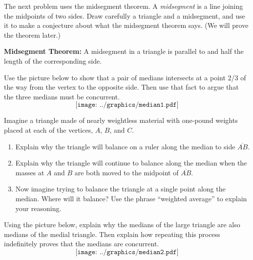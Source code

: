 \begin{prob}
The next problem uses the midsegment theorem.  A \emph{midsegment} is a line joining the midpoints of two sides.  Draw carefully a triangle and a midsegment, and use it to make a conjecture about what the midsegment theorem says.  (We will prove the theorem later.)
\end{prob}

\begin{teachingnote}
\textbf{Midsegment Theorem:}  A midsegment in a triangle is parallel to and half the length of the corresponding side.
\end{teachingnote}

\begin{prob}
Use the picture below to show that a pair of medians intersects at a point 2/3 of the way from the vertex to the opposite side.  Then use that fact to argue that the three medians must be concurrent.  
$$\texttt{[image: ../graphics/median1.pdf]}$$
\end{prob}

\begin{prob}
Imagine a triangle made of nearly weightless material with one-pound weights placed at each of the vertices, $A$, $B$, and $C$.  
\begin{enumerate}
\item Explain why the triangle will balance on a ruler along the median to side $\overline{AB}$.  
\item Explain why the triangle will continue to balance along the median when the masses at $A$ and $B$ are both moved to the midpoint of $\overline{AB}$.  
\item Now imagine trying to balance the triangle at a single point along the median.  Where will it balance?  Use the phrase ``weighted average'' to explain your reasoning.   
\end{enumerate}
\end{prob}

\begin{prob}
Using the picture below, explain why the medians of the large triangle are also medians of the medial triangle.  Then explain how repeating this process indefinitely proves that the medians are concurrent.
$$\texttt{[image: ../graphics/median2.pdf]}$$
\end{prob}
 


